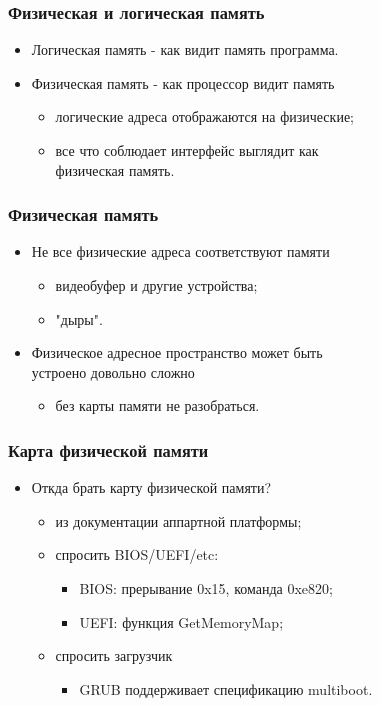 \begin{frame}
\frametitle{Физическая и логическая память}
\begin{itemize}
    \item<1-> Логическая память - как видит память программа.
    \item<2-> Физическая память - как процессор видит память
    \begin{itemize}
        \item<3-> логические адреса отображаются на физические;
        \item<4-> все что соблюдает интерфейс выглядит как \\
        физическая память.
    \end{itemize}
\end{itemize}
\end{frame}

\begin{frame}
\frametitle{Физическая память}
\begin{itemize}
    \item<1-> Не все физические адреса соответствуют памяти
    \begin{itemize}
        \item<1-> видеобуфер и другие устройства;
        \item<2-> "дыры".
    \end{itemize}
    \item<3-> Физическое адресное пространство может быть \\
    устроено довольно сложно
    \begin{itemize}
        \item без карты памяти не разобраться.
    \end{itemize}
\end{itemize}
\end{frame}

\begin{frame}
\frametitle{Карта физической памяти}
\begin{itemize}
    \item<1->Откда брать карту физической памяти?
    \begin{itemize}
        \item<2->из документации аппартной платформы;
        \item<3->спросить BIOS/UEFI/etc:
        \begin{itemize}
            \item BIOS: прерывание 0x15, команда 0xe820;
            \item UEFI: функция GetMemoryMap;
        \end{itemize}
        \item<4->спросить загрузчик
        \begin{itemize}
            \item GRUB поддерживает спецификацию multiboot.
        \end{itemize}
    \end{itemize}
\end{itemize}
\end{frame}
